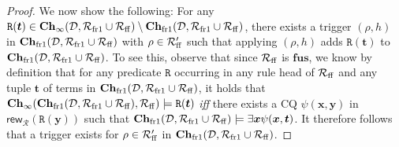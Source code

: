 \documentclass[10pt,a4paper]{amsart}
\theoremstyle{definition}
\numberwithin{equation}{section}
\theoremstyle{plain}
\theoremstyle{definition}
\theoremstyle{myexample}
\theoremstyle{plain}
\theoremstyle{definition}
\renewcommand{\vec}[1]{\boldsymbol{#1}}
\newcommand{\database}{\mathcal{D}}
\newcommand{\db}{\database}
\newcommand{\fcn}[1]{\mathsf{#1}}
\newcommand{\ruleset}{\calr}
\newcommand{\fus}{\mathbf{fus}}
\newcommand{\chase}{\mathbf{Ch}}
\newcommand{\calr}{\mathcal{R}}
\newcommand{\pred}[1]{\mathtt{#1}}
\newcommand{\rpred}{\pred{R}}
\newcommand{\iffi}{\textit{iff} } %
\begin{document}
\begin{proof}
We now show the following: For any $\rpred(\vec{t}) \in \chase_{\infty}(\db,\ruleset_{\smash{\mathrm{fr1}}} \cup \ruleset_{\smash{\mathrm{ff}}}) \setminus \chase_{\smash{\mathrm{fr1}}}(\db,\ruleset_{\smash{\mathrm{fr1}}} \cup \ruleset_{\smash{\mathrm{ff}}})$, there exists a trigger $(\rho,h)$ in $\chase_{\smash{\mathrm{fr1}}}(\db,\ruleset_{\smash{\mathrm{fr1}}} \cup \ruleset_{\smash{\mathrm{ff}}})$ with $\rho \in \ruleset_{\smash{\mathrm{ff}}}'$ such that applying $(\rho,h)$ adds $\rpred(\vec{t})$ to $\chase_{\smash{\mathrm{fr1}}}(\db,\ruleset_{\smash{\mathrm{fr1}}} \cup \ruleset_{\smash{\mathrm{ff}}})$. To see this, observe that since $\ruleset_{\smash{\mathrm{ff}}}$ is $\fus$, we know by definition that for any predicate $\rpred$ occurring in any rule head of $\ruleset_{\smash{\mathrm{ff}}}$ and any tuple $\vec{t}$ of terms in $\chase_{\smash{\mathrm{fr1}}}(\db,\ruleset_{\smash{\mathrm{fr1}}} \cup \ruleset_{\smash{\mathrm{ff}}})$, it holds that   $\chase_{\infty}(\chase_{\smash{\mathrm{fr1}}}(\db,\ruleset_{\smash{\mathrm{fr1}}} \cup \ruleset_{\smash{\mathrm{ff}}}), \ruleset_{\smash{\mathrm{ff}}}) \models \rpred(\vec{t})$ \iffi there exists a CQ $\psi(\vec{x},\vec{y})$ in $\fcn{rew}_{\ruleset}(\rpred(\vec{y}))$ such that $\chase_{\smash{\mathrm{fr1}}}(\db,\ruleset_{\smash{\mathrm{fr1}}} \cup \ruleset_{\smash{\mathrm{ff}}}) \models \exists \vec{x} \psi(\vec{x},\vec{t})$. It therefore follows that a trigger exists for $\rho \in \ruleset_{\smash{\mathrm{ff}}}'$ in $\chase_{\smash{\mathrm{fr1}}}(\db,\ruleset_{\smash{\mathrm{fr1}}} \cup \ruleset_{\smash{\mathrm{ff}}})$.


\end{proof}
\end{document}
